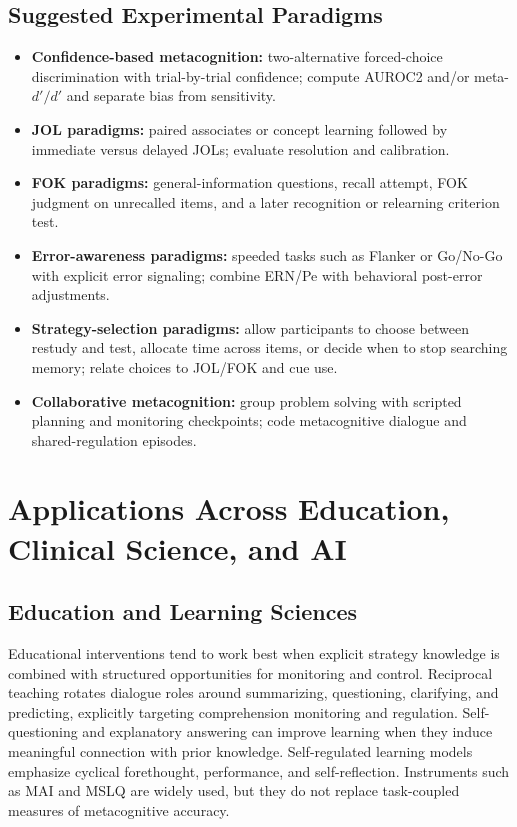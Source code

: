 \documentclass[a4paper]{article}
\begin{document}
   \subsection{Suggested Experimental Paradigms}

   \begin{itemize}
      \item \textbf{Confidence-based metacognition:} two-alternative forced-choice discrimination with trial-by-trial confidence; compute AUROC2 and/or meta-$d'/d'$ and separate bias from sensitivity.
      \item \textbf{JOL paradigms:} paired associates or concept learning followed by immediate versus delayed JOLs; evaluate resolution and calibration.
      \item \textbf{FOK paradigms:} general-information questions, recall attempt, FOK judgment on unrecalled items, and a later recognition or relearning criterion test.
      \item \textbf{Error-awareness paradigms:} speeded tasks such as Flanker or Go/No-Go with explicit error signaling; combine ERN/Pe with behavioral post-error adjustments.
      \item \textbf{Strategy-selection paradigms:} allow participants to choose between restudy and test, allocate time across items, or decide when to stop searching memory; relate choices to JOL/FOK and cue use.
      \item \textbf{Collaborative metacognition:} group problem solving with scripted planning and monitoring checkpoints; code metacognitive dialogue and shared-regulation episodes.
   \end{itemize}

   \section{Applications Across Education, Clinical Science, and AI}

   \subsection{Education and Learning Sciences}

   Educational interventions tend to work best when explicit strategy knowledge is combined with structured opportunities for monitoring and control. Reciprocal teaching rotates dialogue roles around summarizing, questioning, clarifying, and predicting, explicitly targeting comprehension monitoring and regulation. Self-questioning and explanatory answering can improve learning when they induce meaningful connection with prior knowledge. Self-regulated learning models emphasize cyclical forethought, performance, and self-reflection. Instruments such as MAI and MSLQ are widely used, but they do not replace task-coupled measures of metacognitive accuracy.
\end{document}
